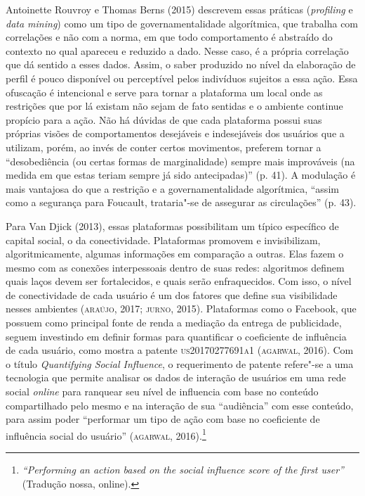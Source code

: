 Antoinette Rouvroy e Thomas Berns (2015) descrevem essas práticas
(\emph{profiling} e \emph{data mining}) como um tipo de
governamentalidade algorítmica, que trabalha com correlações e não com a
norma, em que todo comportamento é abstraído do contexto no qual
apareceu e reduzido a dado. Nesse caso, é a própria correlação que dá
sentido a esses dados. Assim, o saber produzido no nível da elaboração
de perfil é pouco disponível ou perceptível pelos indivíduos sujeitos a
essa ação. Essa ofuscação é intencional e serve para tornar a plataforma
um local onde as restrições que por lá existam não sejam de fato
sentidas e o ambiente continue propício para a ação. Não há dúvidas de
que cada plataforma possui suas próprias visões de comportamentos
desejáveis e indesejáveis dos usuários que a utilizam, porém, ao invés
de conter certos movimentos, preferem tornar a ``desobediência (ou
certas formas de marginalidade) sempre mais improváveis (na medida em
que estas teriam sempre já sido antecipadas)'' (p. 41). A modulação é mais
vantajosa do que a restrição e a governamentalidade algorítmica, ``assim
como a segurança para Foucault, trataria"-se de assegurar as
circulações'' (p. 43).

Para Van Djick (2013), essas plataformas possibilitam um típico
específico de capital social, o da conectividade. Plataformas promovem e
invisibilizam, algoritmicamente, algumas informações em comparação a
outras. Elas fazem o mesmo com as conexões interpessoais dentro de suas
redes: algoritmos definem quais laços devem ser fortalecidos, e quais
serão enfraquecidos. Com isso, o nível de conectividade de cada usuário
é um dos fatores que define sua visibilidade nesses ambientes (\textsc{araújo},
2017; \textsc{jurno}, 2015). Plataformas como o Facebook, que possuem como
principal fonte de renda a mediação da entrega de publicidade, seguem
investindo em definir formas para quantificar o coeficiente de
influência de cada usuário, como mostra a patente \textsc{us20170277691a1}
(\textsc{agarwal}, 2016). Com o título \emph{Quantifying Social Influence}, o
requerimento de patente refere"-se a uma tecnologia que permite analisar
os dados de interação de usuários em uma rede social \emph{online} para
ranquear seu nível de influencia com base no conteúdo compartilhado pelo
mesmo e na interação de sua ``audiência'' com esse conteúdo, para assim
poder ``performar um tipo de ação com base no coeficiente de influência
social do usuário'' (\textsc{agarwal}, 2016).\footnote{\emph{``Performing an action based on the social influence score of the first user''} (Tradução nossa, online).}

